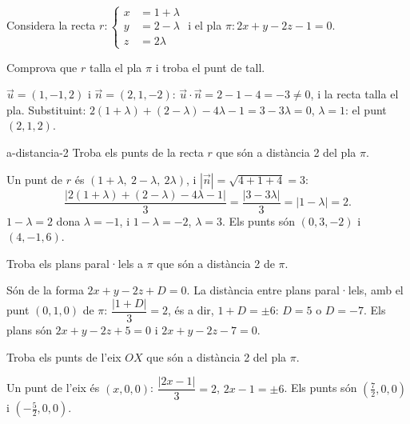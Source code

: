 Considera la recta $r\colon\left\{\begin{aligned}x&=1+\lambda\\y&=2-\lambda\\z&=2\lambda\end{aligned}\right.$
i el pla $\pi\colon 2x+y-2z-1=0$.

\begin{apartats}

Comprova que $r$ talla el pla $\pi$ i troba el punt de tall.

\begin{solucio}
$\vec u=(1,-1,2)$ i $\vec n=(2,1,-2)$: $\vec u\cdot\vec n=2-1-4=-3\ne0$, i la recta talla el pla.
Substituint: $2(1+\lambda)+(2-\lambda)-4\lambda-1=3-3\lambda=0$, $\lambda=1$: el punt $(2,1,2)$.
\end{solucio}

\begin{tria}{a-distancia-2}
Troba els punts de la recta $r$ que són a distància 2 del pla $\pi$.

\begin{solucio}
Un punt de $r$ és $(1+\lambda,\ 2-\lambda,\ 2\lambda)$, i $|\vec n|=\sqrt{4+1+4}=3$:
\[
\frac{|2(1+\lambda)+(2-\lambda)-4\lambda-1|}{3}=\frac{|3-3\lambda|}{3}=|1-\lambda|=2.
\]
$1-\lambda=2$ dona $\lambda=-1$, i $1-\lambda=-2$, $\lambda=3$. Els punts són $(0,3,-2)$ i $(4,-1,6)$.
\end{solucio}

Troba els plans paral·lels a $\pi$ que són a distància 2 de $\pi$.

\begin{solucio}
Són de la forma $2x+y-2z+D=0$. La distància entre plans paral·lels, amb el punt $(0,1,0)$ de $\pi$:
$\dfrac{|1+D|}{3}=2$, és a dir, $1+D=\pm6$: $D=5$ o $D=-7$. Els plans són $2x+y-2z+5=0$ i
$2x+y-2z-7=0$.
\end{solucio}
\end{tria}

\begin{nomesllarg}
Troba els punts de l'eix $OX$ que són a distància 2 del pla $\pi$.

\begin{solucio}
Un punt de l'eix és $(x,0,0)$: $\dfrac{|2x-1|}{3}=2$, $2x-1=\pm6$. Els punts són
$\left(\frac72,0,0\right)$ i $\left(-\frac52,0,0\right)$.
\end{solucio}
\end{nomesllarg}

\end{apartats}
